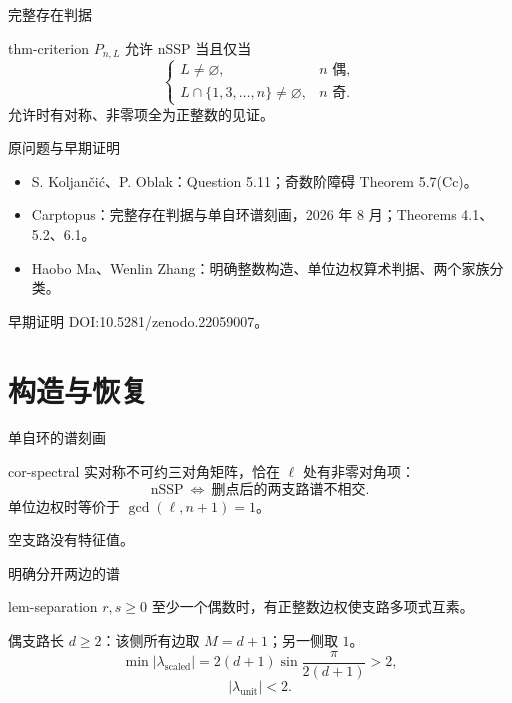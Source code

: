 \documentclass{beamer}
\begin{document}
\begin{frame}{完整存在判据}
\begin{bookresult}{thm-criterion}
$P_{n,L}$ 允许 nSSP 当且仅当
\[
\begin{cases}L\ne\varnothing,&n\text{ 偶},\\
L\cap\{1,3,\ldots,n\}\ne\varnothing,&n\text{ 奇}.
\end{cases}
\]
允许时有对称、非零项全为正整数的见证。
\end{bookresult}
\end{frame}

\begin{frame}{原问题与早期证明}
\begin{itemize}
\item S. Koljančić、P. Oblak：Question 5.11；奇数阶障碍 Theorem 5.7(Cc)。
\item Carptopus：完整存在判据与单自环谱刻画，2026 年 8 月；Theorems 4.1、5.2、6.1。
\item Haobo Ma、Wenlin Zhang：明确整数构造、单位边权算术判据、两个家族分类。
\end{itemize}
\small 早期证明 DOI:10.5281/zenodo.22059007。
\end{frame}

\section{构造与恢复}
\begin{frame}{单自环的谱刻画}
\begin{bookresult}{cor-spectral}
实对称不可约三对角矩阵，恰在 $\ell$ 处有非零对角项：
\[\text{nSSP}\ \Longleftrightarrow\ \text{删点后的两支路谱不相交}.\]
单位边权时等价于 $\gcd(\ell,n+1)=1$。
\end{bookresult}
空支路没有特征值。
\end{frame}

\begin{frame}{明确分开两边的谱}
\begin{bookresult}{lem-separation}
$r,s\geq0$ 至少一个偶数时，有正整数边权使支路多项式互素。
\end{bookresult}
偶支路长 $d\geq2$：该侧所有边取 $M=d+1$；另一侧取 $1$。
\[
\min |\lambda_{\mathrm{scaled}}|=2(d+1)\sin\frac{\pi}{2(d+1)}>2,
\]
\[
|\lambda_{\mathrm{unit}}|<2.
\]
\end{frame}
\end{document}
